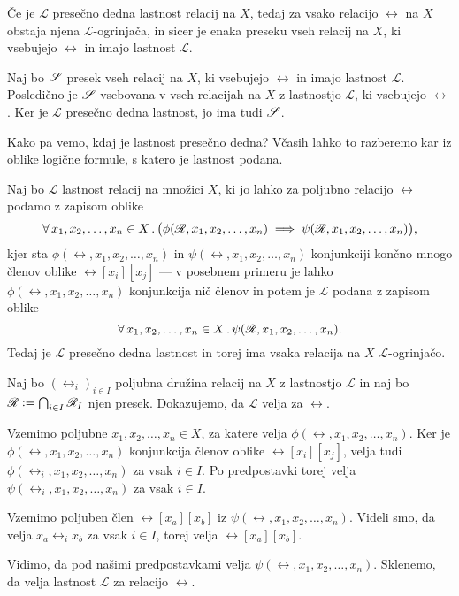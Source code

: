 		\begin{trditev}\label{TRDITEV: obstoj ogrinjače iz presečne dednosti}
			Če je $\mathscr{L}$ presečno dedna lastnost relacij na $X$, tedaj za vsako relacijo $\rel$ na $X$ obstaja njena $\mathscr{L}$-ogrinjača, in sicer je enaka preseku vseh relacij na $X$, ki vsebujejo $\rel$ in imajo lastnost $\mathscr{L}$.
		\end{trditev}
		
		\begin{dokaz}
			Naj bo $\srel$ presek vseh relacij na $X$, ki vsebujejo $\rel$ in imajo lastnost $\mathscr{L}$. Posledično je $\srel$ vsebovana v vseh relacijah na $X$ z lastnostjo $\mathscr{L}$, ki vsebujejo $\rel$. Ker je $\mathscr{L}$ presečno dedna lastnost, jo ima tudi $\srel$.
		\end{dokaz}
		
		Kako pa vemo, kdaj je lastnost presečno dedna? Včasih lahko to razberemo kar iz oblike logične formule, s katero je lastnost podana.
		
		\begin{izrek}\label{IZREK: presečna dednost iz logične oblike}
			Naj bo $\mathscr{L}$ lastnost relacij na množici $X$, ki jo lahko za poljubno relacijo $\rel$ podamo z zapisom oblike
			\[\all[1]{x_1, x_2, \ldots, x_n}[X]{\phi(\rel, x_1, x_2, \ldots, x_n) \implies \psi(\rel, x_1, x_2, \ldots, x_n)},\]
			kjer sta $\phi(\rel, x_1, x_2, \ldots, x_n)$ in $\psi(\rel, x_1, x_2, \ldots, x_n)$ konjunkciji končno mnogo členov oblike $\rel[x_i][x_j]$ --- v posebnem primeru je lahko $\phi(\rel, x_1, x_2, \ldots, x_n)$ konjunkcija nič členov in potem je $\mathscr{L}$ podana z zapisom oblike
			\[\xall{x_1, x_2, \ldots, x_n}[X]{\psi(\rel, x_1, x_2, \ldots, x_n)}.\]
			Tedaj je $\mathscr{L}$ presečno dedna lastnost in torej ima vsaka relacija na $X$ $\mathscr{L}$-ogrinjačo.
		\end{izrek}
		
		\begin{dokaz}
			Naj bo $(\rel_i)_{i \in I}$ poljubna družina relacij na $X$ z lastnostjo $\mathscr{L}$ in naj bo $\rel \dfeq \bigcap_{i \in I} \rel_I$ njen presek. Dokazujemo, da $\mathscr{L}$ velja za $\rel$.
			
			Vzemimo poljubne $x_1, x_2, \ldots, x_n \in X$, za katere velja $\phi(\rel, x_1, x_2, \ldots, x_n)$. Ker je $\phi(\rel, x_1, x_2, \ldots, x_n)$ konjunkcija členov oblike $\rel[x_i][x_j]$, velja tudi $\phi(\rel_i, x_1, x_2, \ldots, x_n)$ za vsak $i \in I$. Po predpostavki torej velja $\psi(\rel_i, x_1, x_2, \ldots, x_n)$ za vsak $i \in I$.
			
			Vzemimo poljuben člen $\rel[x_a][x_b]$ iz $\psi(\rel, x_1, x_2, \ldots, x_n)$. Videli smo, da velja $x_a \mathrel{\rel_i} x_b$ za vsak $i \in I$, torej velja $\rel[x_a][x_b]$.
			
			Vidimo, da pod našimi predpostavkami velja $\psi(\rel, x_1, x_2, \ldots, x_n)$. Sklenemo, da velja lastnost $\mathscr{L}$ za relacijo $\rel$.
		\end{dokaz}
		
